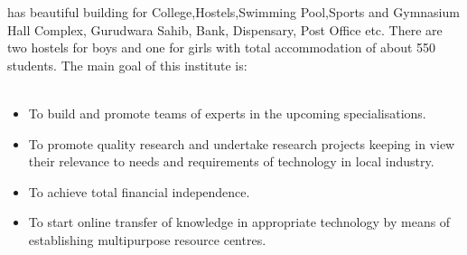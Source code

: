 has beautiful building for College,Hostels,Swimming Pool,Sports and Gymnasium Hall
Complex, Gurudwara Sahib, Bank, Dispensary, Post Office etc. There are two hostels
for boys and one for girls with total accommodation of about 550 students. The main
goal of this institute is:\\\\
\begin{itemize}
\item To build and promote teams of experts in the upcoming specialisations.
\item To promote quality research and undertake research projects keeping in view their
relevance to needs and requirements of technology in local industry.
\item To achieve total financial independence.
\item To start online transfer of knowledge in appropriate technology by means of establishing multipurpose resource centres.
\end{itemize}
